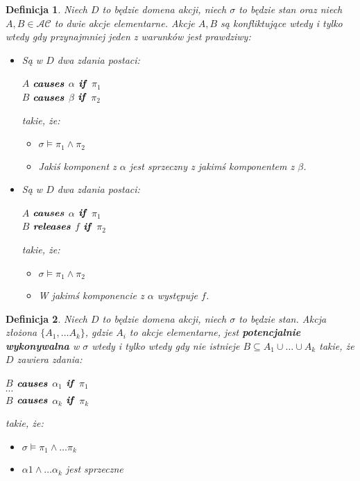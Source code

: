 \documentclass[11pt,a4paper]{article}
\newtheorem{defn}{Definicja}
\DeclareMathOperator{\Causes}{\textbf{\textit{causes}}}
\DeclareMathOperator{\If}{\textbf{\textit{if}}}
\DeclareMathOperator{\Releases}{\textbf{\textit{releases}}}
\begin{document}
\begin{defn}
Niech $D$ to będzie domena akcji, niech $\sigma$ to będzie stan oraz niech $A, B \in \mathcal{AC}$ to dwie akcje elementarne. Akcje $A, B$ są konfliktujące wtedy i tylko wtedy gdy przynajmniej jeden z warunków jest prawdziwy:
\begin{itemize}
    \item Są w $D$ dwa zdania postaci:
    \begin{center}
        $A$ $\Causes$ $\alpha$ $\If$ $\pi_1 $ \\
        $B$ $\Causes$ $\beta$ $\If$ $\pi_2 $
    \end{center}
    takie, że:
    \begin{itemize}
        \item $\sigma \models \pi_1 \land \pi_2$
        \item Jakiś komponent z $\alpha$ jest sprzeczny z jakimś komponentem z $\beta$.
    \end{itemize}
    \item Są w $D$ dwa zdania postaci:
    \begin{center}
        $A$ $\Causes$ $\alpha$ $\If$ $\pi_1 $ \\
        $B$ $\Releases$ $f$ $\If$ $\pi_2 $
    \end{center}
    takie, że:
    \begin{itemize}
        \item $\sigma \models \pi_1 \land \pi_2$
        \item W jakimś komponencie z $\alpha$ występuje $f$.
    \end{itemize}
\end{itemize}
\end{defn}

\begin{defn}
Niech $D$ to będzie domena akcji, niech $\sigma$ to będzie stan. Akcja złożona $\{ A_1, \dots A_k \}$, gdzie $A_i$ to akcje elementarne, jest \textbf{potencjalnie wykonywalna} w $\sigma$ wtedy i tylko wtedy gdy nie istnieje $B \subseteq A_1 \cup \dots \cup A_k$ takie, że $D$ zawiera zdania:
\begin{center}
    $B$ $\Causes$ $\alpha_1$ $\If$ $\pi_1 $ \\
    $\cdots$ \\
    $B$ $\Causes$ $\alpha_k$ $\If$ $\pi_k $
\end{center}
takie, że:
\begin{itemize}
    \item $\sigma \models \pi_1 \land \dots \pi_k$
    \item $\alpha1 \land \dots \alpha_k$ jest sprzeczne
\end{itemize}
\end{defn}
\end{document}
